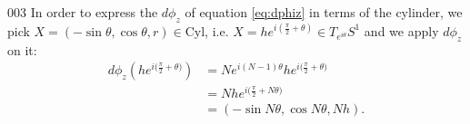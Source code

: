 \begin{corrige}{003}
In order to express the $d\phi_z$ of equation \eqref{eq:dphiz}  in terms of the cylinder, we pick $X=(-\sin\theta,\cos\theta,r)\in\text{Cyl}$, i.e. $X=he^{i( \frac{ \pi }{ 2 }+\theta )}\in T_{e^{i\theta}}S^1$ and we apply $d\phi_z$ on it:
\[
\begin{split}
d\phi_z\left( he^{i\big( \frac{ \pi }{ 2 }+\theta \big)} \right)&=Ne^{i(N-1)\theta}he^{i\big( \frac{ \pi }{2}+\theta \big)}\\
								&=Nhe^{i\big( \frac{ \pi }{2}+N\theta \big)}\\
								&=(-\sin N\theta,\cos N\theta,Nh).
\end{split}
\]

\end{corrige}
